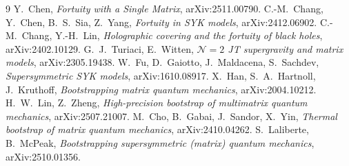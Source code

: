 \documentclass[10pt]{article}
\begin{document}
\begin{thebibliography}{9}\footnotesize\setlength{\itemsep}{0pt}
 Y.~Chen, \emph{Fortuity with a Single Matrix}, arXiv:2511.00790.
 C.-M.~Chang, Y.~Chen, B.~S.~Sia, Z.~Yang, \emph{Fortuity in SYK models}, arXiv:2412.06902.
 C.-M.~Chang, Y.-H.~Lin, \emph{Holographic covering and the fortuity of black holes}, arXiv:2402.10129.
 G.~J.~Turiaci, E.~Witten, \emph{$\mathcal N=2$ JT supergravity and matrix models}, arXiv:2305.19438.
 W.~Fu, D.~Gaiotto, J.~Maldacena, S.~Sachdev, \emph{Supersymmetric SYK models}, arXiv:1610.08917.
 X.~Han, S.~A.~Hartnoll, J.~Kruthoff, \emph{Bootstrapping matrix quantum mechanics}, arXiv:2004.10212.
 H.~W.~Lin, Z.~Zheng, \emph{High-precision bootstrap of multimatrix quantum mechanics}, arXiv:2507.21007.
 M.~Cho, B.~Gabai, J.~Sandor, X.~Yin, \emph{Thermal bootstrap of matrix quantum mechanics}, arXiv:2410.04262.
 S.~Laliberte, B.~McPeak, \emph{Bootstrapping supersymmetric (matrix) quantum mechanics}, arXiv:2510.01356.
\end{thebibliography}
\end{document}
